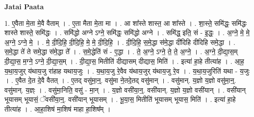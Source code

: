 \documentclass[17pt]{extarticle}
\begin{document}
\textbf{Jatai Paata} \newline

1. ए॒वैता मे॒ता मे॒वै वैताम् । . ए॒ता मैता मे॒ता मा । . आ शा᳚स्ते शास्त॒ आ शा᳚स्ते । . शा॒स्ते॒ समि॑द्धः॒ समि॑द्धः शास्ते शास्ते॒ समि॑द्धः । . समि॑द्धो अग्ने ऽग्ने॒ समि॑द्धः॒ समि॑द्धो अग्ने । . समि॑द्ध॒ इति॒ सं - इ॒द्धः॒ । . अ॒ग्ने॒ मे॒ मे॒ अ॒ग्ने॒ ऽग्ने॒ मे॒ । . मे॒ दी॒दि॒हि॒ दी॒दि॒हि॒ मे॒ मे॒ दी॒दि॒हि॒ । . दी॒दि॒हि॒ स॒मे॒द्धा स॑मे॒द्धा दी॑दिहि दीदिहि समे॒द्धा । . स॒मे॒द्धा ते॑ ते समे॒द्धा स॑मे॒द्धा ते᳚ । . स॒मे॒द्धेति॑ सं - ए॒द्धा । . ते॒ अ॒ग्ने॒ ऽग्ने॒ ते॒ ते॒ अ॒ग्ने॒ । . अ॒ग्ने॒ दी॒द्या॒स॒म् दी॒द्या॒स॒ म॒ग्ने॒ ऽग्ने॒ दी॒द्या॒स॒म् । . दी॒द्या॒स॒ मितीति॑ दीद्यासम् दीद्यास॒ मिति॑ । . इत्या॑ हा॒हे तीत्या॑ह । . आ॒ह॒ य॒था॒य॒जुर् य॑थाय॒जु रा॑हाह यथाय॒जुः । . य॒था॒य॒जु रे॒वैव य॑थाय॒जुर् य॑थाय॒जु रे॒व । . य॒था॒य॒जुरिति॑ यथा - य॒जुः । . ए॒वैत दे॒त दे॒वै वैतत् । . ए॒तद् वसु॑मा॒न्॒. वसु॑मा ने॒तदे॒तद् वसु॑मान् । . वसु॑मान्. य॒ज्ञो य॒ज्ञो वसु॑मा॒न्॒. वसु॑मान्. य॒ज्ञ्ः । . वसु॑मा॒निति॒ वसु॑ - मा॒न् । . य॒ज्ञो वसी॑या॒न्॒. वसी॑यान्. य॒ज्ञो य॒ज्ञो वसी॑यान् । . वसी॑यान् भूयासम् भूयासं॒ ॅवसी॑या॒न्॒. वसी॑यान् भूयासम् । . भू॒या॒स॒ मितीति॑ भूयासम् भूयास॒ मिति॑ । . इत्या॑ हा॒हे तीत्या॑ह । . आ॒हा॒शिष॑ मा॒शिष॑ माहा हा॒शिष᳚म् । \newline
\end{document}

